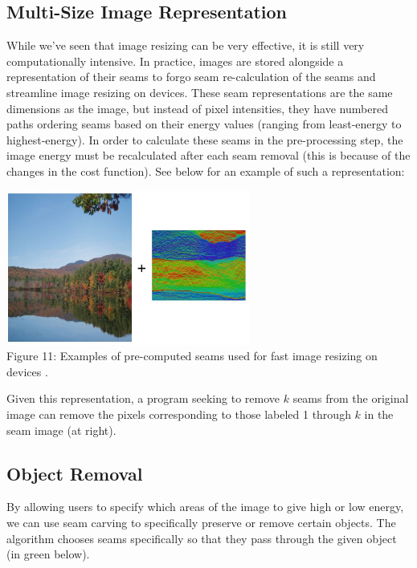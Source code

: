 \documentclass{article}
\begin{document}
\subsection{Multi-Size Image Representation}
While we've seen that image resizing can be very effective, it is still very computationally intensive. In practice, images are stored alongside a representation of their seams to forgo seam re-calculation of the seams and streamline image resizing on devices. These seam representations are the same dimensions as the image, but instead of pixel intensities, they have numbered paths ordering seams based on their energy values (ranging from least-energy to highest-energy). In order to calculate these seams in the pre-processing step, the image energy must be recalculated after each seam removal (this is because of the changes in the cost function). See below for an example of such a representation:
\begin{center}
\includegraphics[width=8cm]{resizing_representation.JPG} \\
Figure 11: Examples of pre-computed seams used for fast image resizing on devices \cite{siggraphseamcarving}.
\end{center}
Given this representation, a program seeking to remove $k$ seams from the original image can remove the pixels corresponding to those labeled 1 through $k$ in the seam image (at right).
\subsection{Object Removal}
By allowing users to specify which areas of the image to give high or low energy, we can use seam carving to specifically preserve or remove certain objects. The algorithm chooses seams specifically so that they pass through the given object (in green below).
\end{document}
